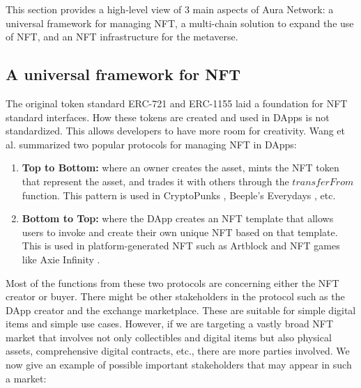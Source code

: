 \documentclass[12pt, titlepage]{article}
\begin{document}
This section provides a high-level view of 3 main aspects of Aura Network: a universal framework for managing NFT, a multi-chain solution to expand the use of NFT, and an NFT infrastructure for the metaverse.

\subsection{A universal framework for NFT}
The original token standard ERC-721 and ERC-1155 laid a foundation for NFT standard interfaces. How these tokens are created and used in DApps is not standardized. This allows developers to have more room for creativity. Wang et al. \cite{wang2021non} summarized two popular protocols for managing NFT in DApps:
\begin{enumerate}
\item \textbf{Top to Bottom:} where an owner creates the asset, mints the NFT token that represent the asset, and trades it with others through the $transferFrom$ function. This pattern is used in CryptoPunks \cite{cryptopunks}, Beeple's Everydays \cite{beeple}, etc.
\item \textbf{Bottom to Top:} where the DApp creates an NFT template that allows users to invoke and create their own unique NFT based on that template. This is used in platform-generated NFT such as Artblock \cite{artblock} and NFT games like Axie Infinity \cite{axie}.
\end{enumerate}

Most of the functions from these two protocols are concerning either the NFT creator or buyer. There might be other stakeholders in the protocol such as the DApp creator and the exchange marketplace. These are suitable for simple digital items and simple use cases. However, if we are targeting a vastly broad NFT market that involves not only collectibles and digital items but also physical assets, comprehensive digital contracts, etc., there are more parties involved. We now give an example of possible important stakeholders that may appear in such a market:
\end{document}
